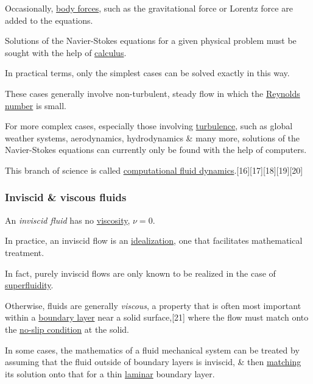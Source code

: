 \documentclass{article}
\begin{document}
Occasionally, \href{https://en.wikipedia.org/wiki/Body_force}{body forces}, such as the gravitational force or Lorentz force are added to the equations.

%
Solutions of the Navier-Stokes equations for a given physical problem must be sought with the help of \href{https://en.wikipedia.org/wiki/Calculus}{calculus}.

In practical terms, only the simplest cases can be solved exactly in this way.

These cases generally involve non-turbulent, steady flow in which the \href{https://en.wikipedia.org/wiki/Reynolds_number}{Reynolds number} is small.

For more complex cases, especially those involving \href{https://en.wikipedia.org/wiki/Turbulence}{turbulence}, such as global weather systems, aerodynamics, hydrodynamics \& many more, solutions of the Navier-Stokes equations can currently only be found with the help of computers.

This branch of science is called \href{https://en.wikipedia.org/wiki/Computational_fluid_dynamics}{computational fluid dynamics}.[16][17][18][19][20]

\subsubsection{Inviscid \& viscous fluids}
An \textit{inviscid fluid} has no \href{https://en.wikipedia.org/wiki/Viscosity}{viscosity}, $\nu = 0$.

In practice, an inviscid flow is an \href{https://en.wikipedia.org/wiki/Ideal_fluid}{idealization}, one that facilitates mathematical treatment.

In fact, purely inviscid flows are only known to be realized in the case of \href{https://en.wikipedia.org/wiki/Superfluidity}{superfluidity}.

Otherwise, fluids are generally \textit{viscous}, a property that is often most important within a \href{https://en.wikipedia.org/wiki/Boundary_layer}{boundary layer} near a solid surface,[21] where the flow must match onto the \href{https://en.wikipedia.org/wiki/No-slip_condition}{no-slip condition} at the solid.

In some cases, the mathematics of a fluid mechanical system can be treated by assuming that the fluid outside of boundary layers is inviscid, \& then \href{https://en.wikipedia.org/wiki/Method_of_matched_asymptotic_expansions}{matching} its solution onto that for a thin \href{https://en.wikipedia.org/wiki/Laminar_flow}{laminar} boundary layer.
\end{document}
